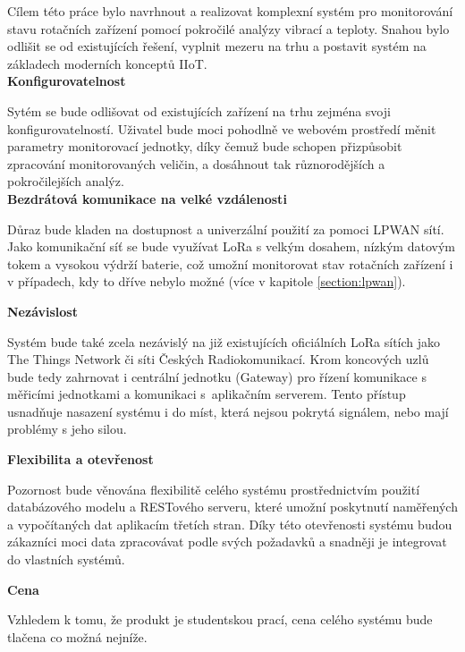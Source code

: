     Cílem této práce bylo navrhnout a realizovat komplexní systém pro monitorování stavu rotačních zařízení pomocí pokročilé analýzy vibrací a teploty. Snahou bylo odlišit se od existujících řešení, vyplnit mezeru na trhu a postavit systém na základech moderních konceptů IIoT.\\
    
    \textbf{Konfigurovatelnost}
    
    Sytém se bude odlišovat od existujících zařízení na trhu zejména svoji konfigurovatelností. Uživatel bude moci pohodlně ve webovém prostředí měnit parametry monitorovací jednotky, díky čemuž bude schopen přizpůsobit zpracování monitorovaných veličin, a dosáhnout tak různorodějších a pokročilejších analýz.\\
    
    \textbf{Bezdrátová komunikace na velké vzdálenosti}
    
    Důraz bude kladen na dostupnost a univerzální použití za pomoci LPWAN sítí. Jako komunikační síť se bude využívat LoRa s velkým dosahem, nízkým datovým tokem a vysokou výdrží baterie, což umožní monitorovat stav rotačních zařízení i v případech, kdy to dříve nebylo možné (více v kapitole \ref{section:lpwan}).
    
    \textbf{Nezávislost}
    
    Systém bude také zcela nezávislý na již existujících oficiálních LoRa sítích jako The Things Network či síti Českých Radiokomunikací. Krom koncových uzlů bude tedy zahrnovat i centrální jednotku (Gateway) pro řízení komunikace s měřicími jednotkami a komunikaci s~aplikačním serverem. Tento přístup usnadňuje nasazení systému i do míst, která nejsou pokrytá signálem, nebo mají problémy s jeho silou.
    
    \textbf{Flexibilita a otevřenost}
    
   Pozornost bude věnována flexibilitě celého systému prostřednictvím použití databázového modelu a RESTového serveru, které umožní poskytnutí naměřených a vypočítaných dat aplikacím třetích stran. Díky této otevřenosti systému budou zákazníci moci data zpracovávat podle svých požadavků a snadněji je integrovat do vlastních systémů.
   
   \textbf{Cena}
   
   Vzhledem k tomu, že produkt je studentskou prací, cena celého systému bude tlačena co možná nejníže.
   
